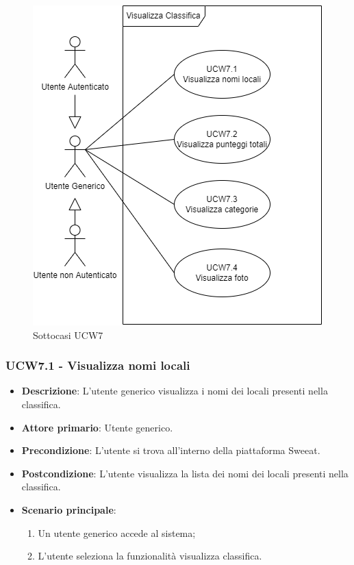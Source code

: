 \begin{figure}[H]
    \centering
        \includegraphics[scale=0.5]{UC_images/UCW7-1.png}
        \caption{Sottocasi UCW7}
\end{figure}

\subsubsection{UCW7.1 - Visualizza nomi locali}
\begin{itemize}
	\item \textbf{Descrizione}: L'utente generico visualizza i nomi dei locali presenti nella classifica.
    \item \textbf{Attore primario}: Utente generico.
    \item \textbf{Precondizione}: L’utente si trova all’interno della piattaforma Sweeat.
    \item \textbf{Postcondizione}: L’utente visualizza la lista dei nomi dei locali presenti nella classifica.
    \item \textbf{Scenario principale}: 
    \begin{enumerate}
        \item Un utente generico accede al sistema;
        \item L’utente seleziona la funzionalità visualizza classifica.
    \end{enumerate}
\end{itemize}

